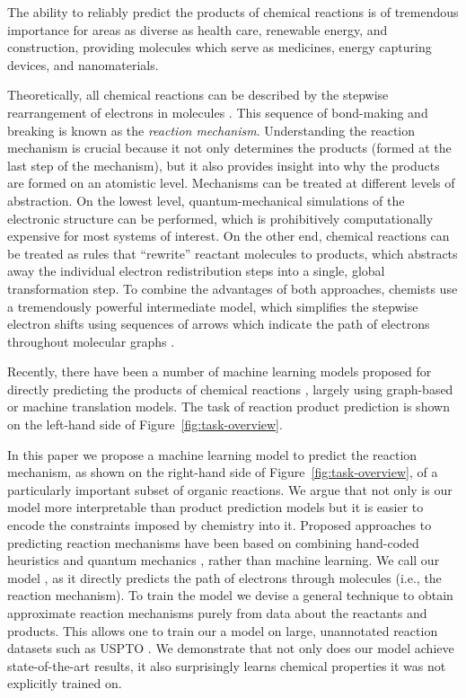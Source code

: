 
The ability to reliably predict the products of chemical reactions is of tremendous importance for areas as diverse as health care, renewable energy, and construction, providing molecules which serve as medicines, energy capturing devices, and nanomaterials. 


Theoretically, all chemical reactions can be described by the stepwise rearrangement of electrons in molecules \cite{herges1994organizing}. 
This sequence of bond-making and breaking is known as the \emph{reaction mechanism}. 
Understanding the reaction mechanism is crucial because it not only determines the products (formed at the last step of the mechanism), 
but it also provides insight into why the products are formed on an atomistic level. 
%
Mechanisms can be treated at different levels of abstraction. 
On the lowest level, quantum-mechanical simulations of the electronic structure can be performed, which is prohibitively computationally expensive for most systems of interest. 
On the other end, chemical reactions can be treated as rules that ``rewrite'' reactant molecules to products, which abstracts away the individual electron redistribution steps into a single, global transformation step. 
To combine the advantages of both approaches, chemists use a tremendously powerful intermediate model, which simplifies the stepwise electron shifts using sequences of arrows which indicate the path of electrons throughout molecular graphs \cite{herges1994organizing}. 

Recently, there have been a number of machine learning models proposed for directly predicting the products of chemical reactions \cite{coley2017prediction,jin2017predicting,schwaller2017found,neural-symbolic,segler2018planning,wei2016neural}, largely using graph-based or machine translation models. 
The task of reaction product prediction is shown on the left-hand side of Figure~\ref{fig:task-overview}. 

In this paper we propose a machine learning model to predict the reaction mechanism, as shown on the right-hand side of Figure~\ref{fig:task-overview}, of a particularly important subset of organic reactions.
We argue that not only is our model more interpretable than product prediction models but it is easier to encode the constraints imposed by chemistry into it. 
Proposed approaches to predicting reaction mechanisms have been based on combining hand-coded heuristics and quantum mechanics \cite{bergeler2015heuristics,kim2018efficient,rappoport2014complex,simm2017context,zimmerman2013automated}, 
rather than machine learning.
We call our model \ourModel, as it directly predicts the path of electrons through molecules (i.e., the reaction mechanism). To train the model we devise a general technique to obtain approximate reaction mechanisms purely from data about the reactants and products. This allows one to train our a model on large, unannotated reaction datasets such as USPTO \cite{lowe2012extraction}. We demonstrate that not only does our model achieve state-of-the-art results, it also surprisingly learns chemical properties it was not explicitly trained on.



